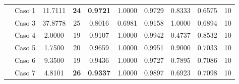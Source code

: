 \begin{table}[]
{\begin{tabular}{cccccccccc}
			\multicolumn{1}{c|}{}                      & {\color[HTML]{003532} Caso 1} & {\color[HTML]{003532} 11.7111}                                       & {\color[HTML]{9A0000} \textbf{24}}                                 & {\color[HTML]{9A0000} \textbf{0.9721}}                  & {\color[HTML]{003532} 1.0000} & {\color[HTML]{003532} 0.9729} & {\color[HTML]{003532} 0.8333} & {\color[HTML]{003532} 0.6575} & {\color[HTML]{003532} 10}                                            \\
			\multicolumn{1}{c|}{}                      & Caso 3                        & 37.8778                                                              & 25                                                                 & 0.8016                                                  & 0.6981                        & 0.9158                        & 1.0000                        & 0.6894                        & 10                                                                   \\
			\multicolumn{1}{c|}{}                      & {\color[HTML]{003532} Caso 4} & {\color[HTML]{003532} 2.0000}                                        & {\color[HTML]{003532} 19}                                          & {\color[HTML]{003532} 0.9107}                           & {\color[HTML]{003532} 1.0000} & {\color[HTML]{003532} 0.9942} & {\color[HTML]{003532} 0.4737} & {\color[HTML]{003532} 0.8532} & {\color[HTML]{003532} 10}                                            \\
			\multicolumn{1}{c|}{}                      & Caso 5                        & 1.7500                                                               & 20                                                                 & 0.9659                                                  & 1.0000                        & 0.9951                        & 0.9000                        & 0.7033                        & 10                                                                   \\
			\multicolumn{1}{c|}{}                      & {\color[HTML]{003532} Caso 6} & {\color[HTML]{003532} 9.3500}                                        & {\color[HTML]{003532} 19}                                          & {\color[HTML]{003532} 0.9436}                           & {\color[HTML]{003532} 1.0000} & {\color[HTML]{003532} 0.9727} & {\color[HTML]{003532} 0.7895} & {\color[HTML]{003532} 0.7086} & {\color[HTML]{003532} 10}                                            \\
			\multicolumn{1}{c|}{}                      & Caso 7                        & 4.8101                                                               & {\color[HTML]{9A0000} \textbf{26}}                                 & {\color[HTML]{9A0000} \textbf{0.9337}}                  & 1.0000                        & 0.9897                        & 0.6923                        & 0.7098                        & 10                                                                   \\

\end{tabular}}
\end{table}

